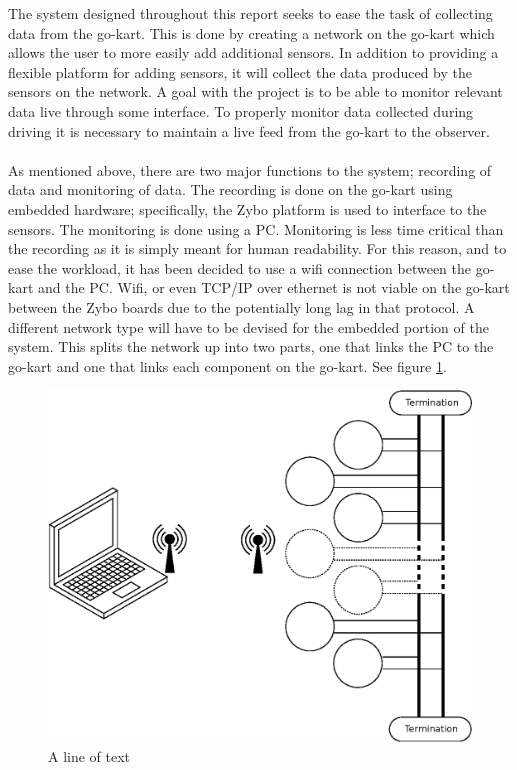 The system designed throughout this report seeks to ease the task of collecting data from the go-kart.
This is done by creating a network on the go-kart which allows the user to more easily add additional sensors.
In addition to providing a flexible platform for adding sensors, it will collect the data produced by the sensors on the network.
A goal with the project is to be able to monitor relevant data live through some interface.
To properly monitor data collected during driving it is necessary to maintain a live feed from the go-kart to the observer.
\\~\\
As mentioned above, there are two major functions to the system; recording of data and monitoring of data.
The recording is done on the go-kart using embedded hardware; specifically, the Zybo platform is used to interface to the sensors.
The monitoring is done using a PC.
Monitoring is less time critical than the recording as it is simply meant for human readability.
For this reason, and to ease the workload, it has been decided to use a wifi connection between the go-kart and the PC.
Wifi, or even TCP/IP over ethernet is not viable on the go-kart between the Zybo boards due to the potentially long lag in that protocol.
A different network type will have to be devised for the embedded portion of the system.
This splits the network up into two parts, one that links the PC to the go-kart and one that links each component on the go-kart.
See figure \ref{fig:basic_network}.

\begin{figure}
	\includegraphics[width=.75\linewidth]{graphics/basic_network}
	\caption{A line of text}
	\label{fig:basic_network}
\end{figure}

